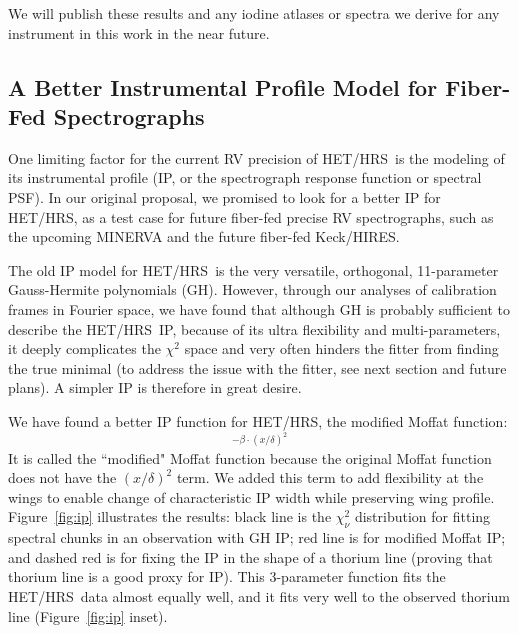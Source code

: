 \documentclass[12pt]{article}
\def\hrs{HET/HRS}
\begin{document}
We will publish these results and any iodine atlases or spectra we
derive for any instrument in this work in the near future.


\vspace{-10pt}
\subsection{A Better Instrumental Profile Model for Fiber-Fed Spectrographs}\label{sec:ip}
\vspace{-5pt}

One limiting factor for the current RV precision of \hrs\ is the
modeling of its instrumental profile (IP, or the spectrograph response
function or spectral PSF). In our original proposal, we promised to
look for a better IP for \hrs, as a test case for future fiber-fed
precise RV spectrographs, such as the upcoming MINERVA and the future
fiber-fed Keck/HIRES.

The old IP model for \hrs\ is the very versatile, orthogonal,
11-parameter Gauss-Hermite polynomials (GH). However, through our
analyses of calibration frames in Fourier space, we have found that
although GH is probably sufficient to describe the \hrs\ IP, because
of its ultra flexibility and multi-parameters, it deeply complicates
the $\chi^2$ space and very often hinders the fitter from finding the
true minimal (to address the issue with the fitter, see next section
and future plans). A simpler IP is therefore in great desire.

We have found a better IP function for \hrs, the modified Moffat function:
\begin{equation}
[1+(x/\theta)^2]^{-\beta\cdot(x/\delta)^2}
\end{equation} 
It is called the ``modified" Moffat function because the original
Moffat function does not have the $(x/\delta)^2$ term. We added this
term to add flexibility at the wings to enable change of characteristic
IP width while preserving wing profile. Figure~\ref{fig:ip}
illustrates the results: black line is the $\chi^2_\nu$ distribution
for fitting spectral chunks in an observation with GH IP; red line is
for modified Moffat IP; and dashed red is for fixing the IP in the
shape of a thorium line (proving that thorium line is a good proxy for
IP). This 3-parameter function fits the \hrs\ data almost equally
well, and it fits very well to the observed thorium line
(Figure~\ref{fig:ip} inset).
\end{document}
